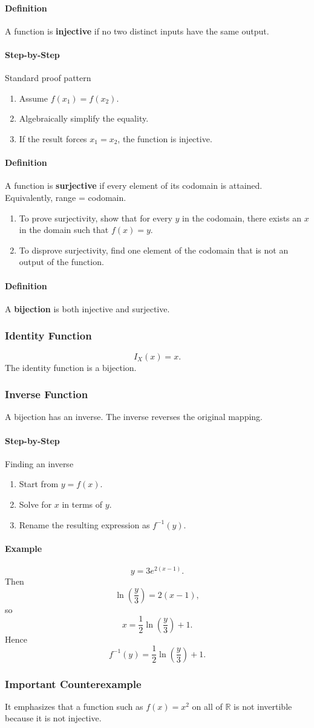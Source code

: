\documentclass[12pt]{article}
\newcommand{\Definition}{\paragraph{Definition}}
\newcommand{\Step}{\paragraph{Step-by-Step}}
\newcommand{\Example}{\paragraph{Example}}
\begin{document}
\Definition A function is \textbf{injective} if no two distinct inputs have the same output.

\Step{Standard proof pattern}
\begin{enumerate}
    \item Assume $f(x_1)=f(x_2)$.
    \item Algebraically simplify the equality.
    \item If the result forces $x_1=x_2$, the function is injective.
\end{enumerate}

\Definition A function is \textbf{surjective} if every element of its codomain is attained. Equivalently, range = codomain.

\begin{enumerate}
    \item To prove surjectivity, show that for every $y$ in the codomain, there exists an $x$ in the domain such that $f(x)=y$.
    \item To disprove surjectivity, find one element of the codomain that is not an output of the function.
\end{enumerate}

\Definition A \textbf{bijection} is both injective and surjective.

\subsubsection{Identity Function}
\[
I_X(x)=x.
\]
The identity function is a bijection.

\subsubsection{Inverse Function}
A bijection has an inverse. The inverse reverses the original mapping.

\Step{Finding an inverse}
\begin{enumerate}
    \item Start from $y=f(x)$.
    \item Solve for $x$ in terms of $y$.
    \item Rename the resulting expression as $f^{-1}(y)$.
\end{enumerate}

\Example 
\[
y=3e^{2(x-1)}.
\]
Then
\[
\ln\left(\frac y3\right)=2(x-1),
\]
so
\[
x=\frac12\ln\left(\frac y3\right)+1.
\]
Hence
\[
f^{-1}(y)=\frac12\ln\left(\frac y3\right)+1.
\]

\subsubsection{Important Counterexample}
It emphasizes that a function such as $f(x)=x^2$ on all of $\mathbb R$ is not invertible because it is not injective.
\end{document}
